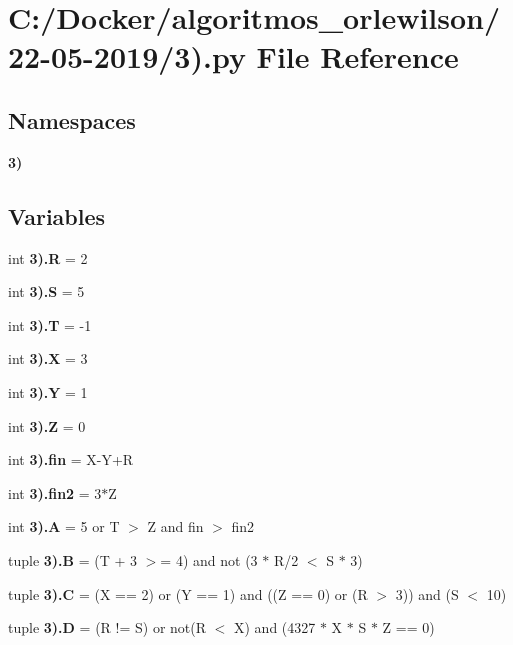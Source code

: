 \section{C\+:/\+Docker/algoritmos\+\_\+orlewilson/22-\/05-\/2019/3).py File Reference}
\label{22-05-2019_23_08_8py}
\subsection*{Namespaces}
\begin{DoxyCompactItemize}
\item 
 \textbf{ 3)}
\end{DoxyCompactItemize}
\subsection*{Variables}
\begin{DoxyCompactItemize}
\item 
int \textbf{ 3).\+R} = 2
\item 
int \textbf{ 3).\+S} = 5
\item 
int \textbf{ 3).\+T} = -\/1
\item 
int \textbf{ 3).\+X} = 3
\item 
int \textbf{ 3).\+Y} = 1
\item 
int \textbf{ 3).\+Z} = 0
\item 
int \textbf{ 3).\+fin} = X-\/Y+R
\item 
int \textbf{ 3).\+fin2} = 3$\ast$Z
\item 
int \textbf{ 3).\+A} = 5 or T $>$ Z and fin $>$ fin2
\item 
tuple \textbf{ 3).\+B} = (T + 3 $>$= 4) and not (3 $\ast$ R/2 $<$ S $\ast$ 3)
\item 
tuple \textbf{ 3).\+C} = (X == 2) or (Y == 1) and ((Z == 0) or (R $>$ 3)) and (S $<$ 10)
\item 
tuple \textbf{ 3).\+D} = (R != S) or not(R $<$ X) and (4327 $\ast$ X $\ast$ S $\ast$ Z == 0)
\end{DoxyCompactItemize}
